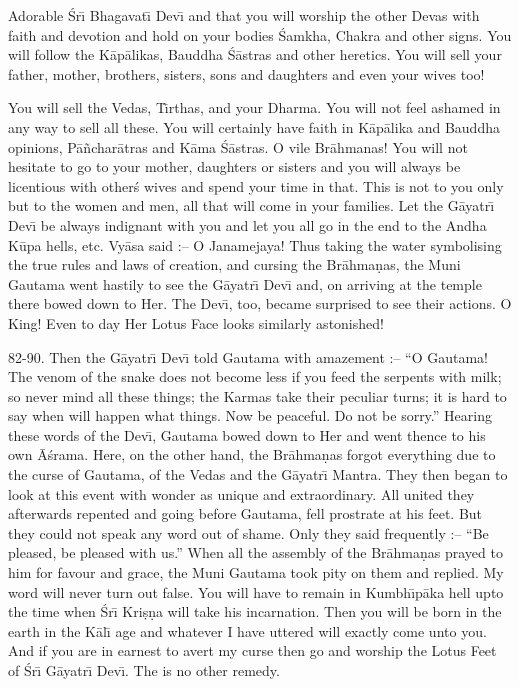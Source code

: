 Adorable \'Sr\={\i} Bhagavat\={\i} Dev\={\i} and that you will worship the other Devas with faith and devotion and hold on your bodies \'Samkha, Chakra and other signs. You will follow the K\=ap\=alikas, Bauddha \'S\=astras and other heretics. You will sell your father, mother, brothers, sisters, sons and daughters and even your wives too!

You will sell the Vedas, T\={\i}rthas, and your Dharma. You will not feel ashamed in any way to sell all these. You will certainly have faith in K\=ap\=alika and Bauddha opinions, P\=a\~nchar\=atras and K\=ama \'S\=astras. O vile Br\=ahmanas! You will not hesitate to go to your mother, daughters or sisters and you will always be licentious with other\'s wives and spend your time in that. This is not to you only but to the women and men, all that will come in your families. Let the G\=ayatr\={\i} Dev\={\i} be always indignant with you and let you all go in the end to the Andha K\=upa hells, etc. Vy\=asa said :-- O Janamejaya! Thus taking the water symbolising the true rules and laws of creation, and cursing the Br\=ahma\d{n}as, the Muni Gautama went hastily to see the G\=ayatr\={\i} Dev\={\i} and, on arriving at the temple there bowed down to Her. The Dev\={\i}, too, became surprised to see their actions. O King! Even to day Her Lotus Face looks similarly astonished!

82-90. Then the G\=ayatr\={\i} Dev\={\i} told Gautama with amazement :-- ``O Gautama! The venom of the snake does not become less if you feed the serpents with milk; so never mind all these things; the Karmas take their peculiar turns; it is hard to say when will happen what things. Now be peaceful. Do not be sorry.'' Hearing these words of the Dev\={\i}, Gautama bowed down to Her and went thence to his own \=A\'srama. Here, on the other hand, the Br\=ahma\d{n}as forgot everything due to the curse of Gautama, of the Vedas and the G\=ayatr\={\i} Mantra. They then began to look at this event with wonder as unique and extraordinary. All united they afterwards repented and going before Gautama, fell prostrate at his feet. But they could not speak any word out of shame. Only they said frequently :-- ``Be pleased, be pleased with us.'' When all the assembly of the Br\=ahma\d{n}as prayed to him for favour and grace, the Muni Gautama took pity on them and replied. My word will never turn out false. You will have to remain in Kumbh\={\i}p\=aka hell upto the time when \'Sr\={\i} Kri\d{s}\d{n}a will take his incarnation. Then you will be born in the earth in the K\=al\={\i} age and whatever I have uttered will exactly come unto you. And if you are in earnest to avert my curse then go and worship the Lotus Feet of \'Sr\={\i} G\=ayatr\={\i} Dev\={\i}. The is no other remedy.

